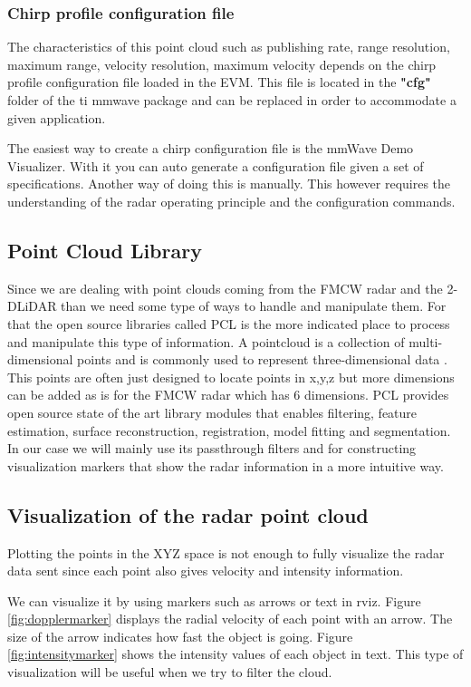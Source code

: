 \subsubsection{Chirp profile configuration file}
The characteristics of this point cloud such as publishing rate, range resolution, maximum range, velocity resolution, maximum velocity depends on the chirp profile configuration file loaded in the EVM. This file is located in the \textbf{"cfg"} folder of the ti mmwave package and can be replaced in order to accommodate a given application.

The easiest way to create a chirp configuration file is the mmWave Demo Visualizer. With it you can auto generate a configuration file given a set of specifications.
Another way of doing this is manually. This however requires the understanding of the radar operating principle and the configuration commands.



\subsection{Point Cloud Library}
Since we are dealing with point clouds coming from the \ac{FMCW} \ac{radar} and the 2-D\ac{LiDAR} than we need some type of ways to handle and manipulate them. For that the open source libraries called \ac{PCL} is the more indicated place to process and manipulate this type of information. A pointcloud is a collection of multi-dimensional points and is commonly used to represent three-dimensional data \cite{pcl}. This points are often just designed to locate points in x,y,z but more dimensions can be added as is for the FMCW radar which has 6 dimensions. \ac{PCL} provides open source state of the art library modules that enables  filtering, feature estimation, surface reconstruction, registration, model fitting and segmentation. In our case we will mainly use its passthrough filters and for constructing visualization markers that show the \ac{radar} information in a more intuitive way.

\subsection{Visualization of the radar point cloud}
Plotting the points in the XYZ space is not enough to fully visualize the radar data sent since each point also gives velocity and intensity information.

We can visualize it by using markers such as arrows or text in rviz.
Figure \ref{fig:dopplermarker} displays the radial velocity of each point with an arrow. The size of the arrow indicates how fast the object is going. Figure \ref{fig:intensitymarker} shows the intensity values of each object in text. This type of visualization will be useful when we try to filter the cloud.


